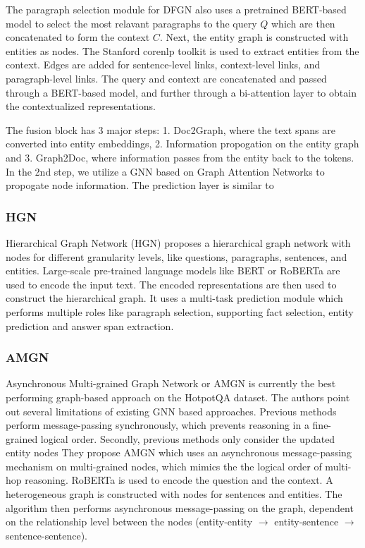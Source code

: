 \documentclass[sigplan,screen]{acmart}
\begin{document}
The paragraph selection module for DFGN also uses a pretrained BERT-based model \cite{RN153} to select the most relavant paragraphs to the query $Q$ which 
are then concatenated to form the context $C$. Next, the entity graph is constructed with entities as nodes. The Stanford corenlp toolkit \cite{RN170} is used 
to extract entities from the context. Edges are added for sentence-level links, context-level links, and paragraph-level links. The query and context are 
concatenated and passed through a BERT-based model, and further through a bi-attention layer to obtain the contextualized representations.

The fusion block has 3 major steps: 1. Doc2Graph, where the text spans are converted into entity embeddings, 2. Information propogation on the entity graph and 3. Graph2Doc, where 
information passes from the entity back to the tokens. In the 2nd step, we utilize a GNN based on Graph Attention Networks \cite{RN7} to propogate node information. The prediction layer is 
similar to \cite{RN116}

\subsubsection{HGN}
Hierarchical Graph Network (HGN) \cite{RN119} proposes a hierarchical graph network with nodes for different granularity levels, like questions, paragraphs, sentences, and entities.
Large-scale pre-trained language models like BERT \cite{RN153} or RoBERTa \cite{RN171} are used to encode the input text. The encoded representations are then used to construct the hierarchical graph.
It uses a multi-task prediction module which performs multiple roles like paragraph selection, supporting fact selection, entity prediction and answer span extraction.

\subsubsection{AMGN}
Asynchronous Multi-grained Graph Network \cite{RN131} or AMGN is currently the best performing graph-based approach on the HotpotQA dataset.
The authors point out several limitations of existing GNN based approaches. Previous methods perform message-passing synchronously,
which prevents reasoning in a fine-grained logical order. Secondly, previous methods only consider the  updated entity nodes
They propose AMGN which uses an asynchronous message-passing mechanism on multi-grained nodes, which mimics the the logical order of multi-hop reasoning.
RoBERTa \cite{RN171} is used to encode the question and the context. A heterogeneous graph is constructed with nodes for sentences and entities. The algorithm
then performs asynchronous message-passing on the graph, dependent on the relationship level between the nodes (entity-entity $\to$ entity-sentence $\to$ sentence-sentence).
\end{document}
